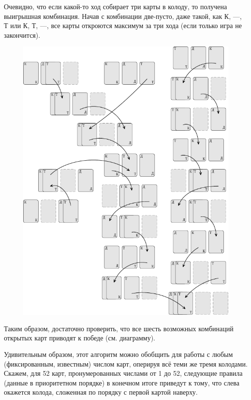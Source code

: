 \documentclass[twoside]{book}
\begin{document}
Очевидно, что если какой-то ход собирает три карты в колоду, то получена выигрышная комбинация.
Начав с комбинации две-пусто, даже такой, как К, ---, Т или
К, Т, ---, все карты откроются максимум за три хода (если только игра не закончится).
\begin{figure}[!ht]
\centering
 \includegraphics{mp/wink-24}
\end{figure}
Таким образом, достаточно проверить, что все шесть возможных комбинаций открытых карт приводят к победе  (см. диаграмму).
\heart

Удивительным образом, этот алгоритм можно обобщить для работы с любым (фиксированным, известным) числом карт, оперируя всё теми же тремя колодами.
Скажем, для 52 карт, пронумерованных числами от 1 до 52, следующие правила (данные в приоритетном порядке) в конечном итоге приведут к тому, что слева окажется колода, сложенная по порядку с первой картой наверху.
\end{document}
